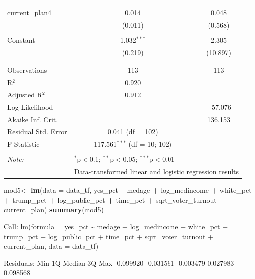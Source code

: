 \documentclass[
]{article}
\newenvironment{Shaded}{\begin{snugshade}}{\end{snugshade}}
\newcommand{\DataTypeTok}[1]{\textcolor[rgb]{0.13,0.29,0.53}{#1}}
\newcommand{\KeywordTok}[1]{\textcolor[rgb]{0.13,0.29,0.53}{\textbf{#1}}}
\newcommand{\NormalTok}[1]{#1}
\newcommand{\OperatorTok}[1]{\textcolor[rgb]{0.81,0.36,0.00}{\textbf{#1}}}
\newcommand{\StringTok}[1]{\textcolor[rgb]{0.31,0.60,0.02}{#1}}
\begin{document}
\begin{table}[!htbp]
\begin{tabular}{@{\extracolsep{5pt}}lcc}
  & & \\ 
 current\_plan4 & 0.014 & 0.048 \\ 
  & (0.011) & (0.568) \\ 
  & & \\ 
 Constant & 1.032$^{***}$ & 2.305 \\ 
  & (0.219) & (10.897) \\ 
  & & \\ 
\hline \\[-1.8ex] 
Observations & 113 & 113 \\ 
R$^{2}$ & 0.920 &  \\ 
Adjusted R$^{2}$ & 0.912 &  \\ 
Log Likelihood &  & $-$57.076 \\ 
Akaike Inf. Crit. &  & 136.153 \\ 
Residual Std. Error & 0.041 (df = 102) &  \\ 
F Statistic & 117.561$^{***}$ (df = 10; 102) &  \\ 
\hline 
\hline \\[-1.8ex] 
\textit{Note:}  & \multicolumn{2}{l}{$^{*}$p$<$0.1; $^{**}$p$<$0.05; $^{***}$p$<$0.01} \\ 
 & \multicolumn{2}{l}{Data-transformed linear and logistic regression results} \\ 
\end{tabular} 
\end{table}

\begin{Shaded}
\begin{Highlighting}[]
\NormalTok{mod5<-}\StringTok{ }\KeywordTok{lm}\NormalTok{(}\DataTypeTok{data =}\NormalTok{ data_tf, yes_pct }\OperatorTok{~}\StringTok{ }\NormalTok{medage }\OperatorTok{+}\StringTok{ }\NormalTok{log_medincome }\OperatorTok{+}\StringTok{ }\NormalTok{white_pct }\OperatorTok{+}\StringTok{ }\NormalTok{trump_pct}
           \OperatorTok{+}\StringTok{ }\NormalTok{log_public_pct }\OperatorTok{+}\StringTok{ }\NormalTok{time_pct  }\OperatorTok{+}\StringTok{ }\NormalTok{sqrt_voter_turnout }\OperatorTok{+}
\StringTok{              }\NormalTok{current_plan)}
\KeywordTok{summary}\NormalTok{(mod5)}
\end{Highlighting}
\end{Shaded}

Call: lm(formula = yes\_pct \textasciitilde{} medage + log\_medincome +
white\_pct + trump\_pct + log\_public\_pct + time\_pct +
sqrt\_voter\_turnout + current\_plan, data = data\_tf)

Residuals: Min 1Q Median 3Q Max -0.099920 -0.031591 -0.003479 0.027983
0.098568
\end{document}
